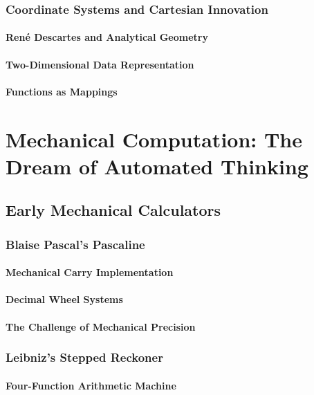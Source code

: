 \documentclass[12pt, oneside, openany]{book}
\begin{document}
\subsection{Coordinate Systems and Cartesian Innovation}
\subsubsection{René Descartes and Analytical Geometry}
\subsubsection{Two-Dimensional Data Representation}
\subsubsection{Functions as Mappings}


\chapter{Mechanical Computation: The Dream of Automated Thinking}

\section{Early Mechanical Calculators}
\subsection{Blaise Pascal's Pascaline}
\subsubsection{Mechanical Carry Implementation}
\subsubsection{Decimal Wheel Systems}
\subsubsection{The Challenge of Mechanical Precision}

\subsection{Leibniz's Stepped Reckoner}
\subsubsection{Four-Function Arithmetic Machine}
\end{document}
